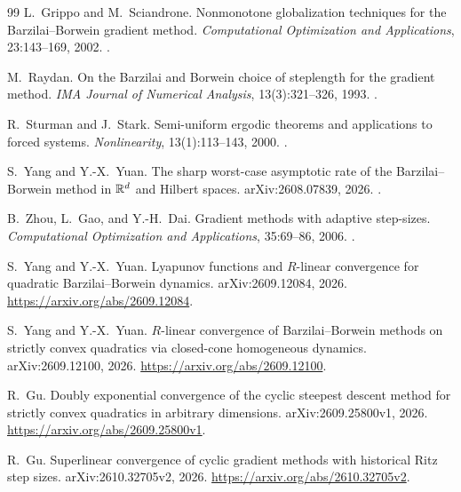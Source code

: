 \begin{thebibliography}{99}
L.~Grippo and M.~Sciandrone.
Nonmonotone globalization techniques for the Barzilai--Borwein gradient method.
\emph{Computational Optimization and Applications}, 23:143--169, 2002.
.


M.~Raydan.
On the Barzilai and Borwein choice of steplength for the gradient method.
\emph{IMA Journal of Numerical Analysis}, 13(3):321--326, 1993.
.


R.~Sturman and J.~Stark.
Semi-uniform ergodic theorems and applications to forced systems.
\emph{Nonlinearity}, 13(1):113--143, 2000.
.


S.~Yang and Y.-X.~Yuan.
The sharp worst-case asymptotic rate of the Barzilai--Borwein method in
$\mathbb R^d$ and Hilbert spaces.
arXiv:2608.07839, 2026.
.


B.~Zhou, L.~Gao, and Y.-H.~Dai.
Gradient methods with adaptive step-sizes.
\emph{Computational Optimization and Applications}, 35:69--86, 2006.
.


S.~Yang and Y.-X.~Yuan.
Lyapunov functions and $R$-linear convergence for quadratic
Barzilai--Borwein dynamics.
arXiv:2609.12084, 2026.
\url{https://arxiv.org/abs/2609.12084}.


S.~Yang and Y.-X.~Yuan.
$R$-linear convergence of Barzilai--Borwein methods on strictly convex
quadratics via closed-cone homogeneous dynamics.
arXiv:2609.12100, 2026.
\url{https://arxiv.org/abs/2609.12100}.


R.~Gu.
Doubly exponential convergence of the cyclic steepest descent method
for strictly convex quadratics in arbitrary dimensions.
arXiv:2609.25800v1, 2026.
\url{https://arxiv.org/abs/2609.25800v1}.

R.~Gu.
Superlinear convergence of cyclic gradient methods with historical Ritz step sizes.
arXiv:2610.32705v2, 2026.
\url{https://arxiv.org/abs/2610.32705v2}.

\end{thebibliography}
